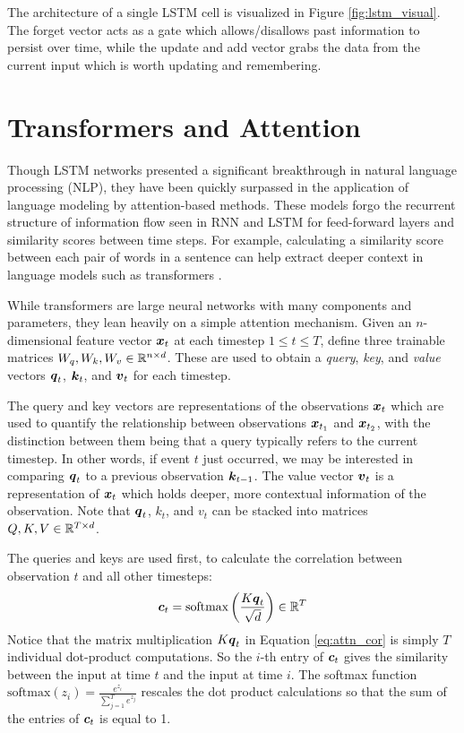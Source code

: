 The architecture of a single LSTM cell is visualized in Figure \ref{fig:lstm_visual}. The forget vector acts as a gate which allows/disallows past information to persist over time, while the update and add vector grabs the data from the current input which is worth updating and remembering.


\section{Transformers and Attention}\label{sec:transformers}
Though LSTM networks presented a significant breakthrough in natural language processing (NLP), they have been quickly surpassed in the application of language modeling by attention-based methods. These models forgo the recurrent structure of information flow seen in RNN and LSTM for feed-forward layers and similarity scores between time steps. For example, calculating a similarity score between each pair of words in a sentence can help extract deeper context in language models such as transformers \cite{vaswani2017}.

While transformers are large neural networks with many components and parameters, they lean heavily on a simple attention mechanism. Given an $n$-dimensional feature vector $\boldsymbol{x}_t$ at each timestep $1\leq t\leq T$, define three trainable matrices $W_q, W_k, W_v \in \mathbb{R}^{n\times d}$. These are used to obtain a \textit{query}, \textit{key}, and \textit{value} vectors $\boldsymbol{q}_t$, $\boldsymbol{k}_t$, and $\boldsymbol{v}_t$ for each timestep. 

The query and key vectors are representations of the observations $\boldsymbol{x}_t$ which are used to quantify the relationship between observations $\boldsymbol{x}_{t_1}$ and $\boldsymbol{x}_{t_2}$, with the distinction between them being that a query typically refers to the current timestep. In other words, if event $t$ just occurred, we may be interested in comparing $\boldsymbol{q}_t$ to a previous observation $\boldsymbol{k}_{t-1}$. The value vector $\boldsymbol{v}_t$ is a representation of $\boldsymbol{x}_t$ which holds deeper, more contextual information of the observation. Note that $\boldsymbol{q}_t$, $k_t$, and $v_t$ can be stacked into matrices $Q,K,V \in \mathbb{R}^{T\times d}$. 

The queries and keys are used first, to calculate the correlation between observation $t$ and all other timesteps:
\begin{equation}
  \boldsymbol{c}_t = \text{softmax}\left(\frac{K \boldsymbol{q}_t}{\sqrt{d}} \right) \in \mathbb{R}^T
  \label{eq:attn_cor}
\end{equation}
Notice that the matrix multiplication $K \boldsymbol{q}_t$ in Equation \ref{eq:attn_cor} is simply $T$ individual dot-product computations. So the $i$-th entry of $\boldsymbol{c}_t$ gives the similarity between the input at time $t$ and the input at time $i$. The softmax function $\text{softmax}(z_i) = \frac{e^{z_i}}{\sum_{j=1}^T e^{z_j}}$ rescales the dot product calculations so that the sum of the entries of $\boldsymbol{c}_t$ is equal to 1. 

